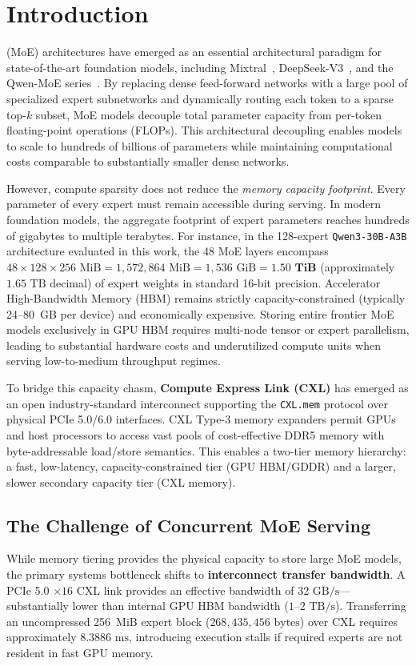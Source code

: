 \documentclass[10pt,journal,compsoc]{IEEEtran}
\begin{document}
\section{Introduction}
 (MoE) architectures have emerged as an essential architectural paradigm for state-of-the-art foundation models, including Mixtral~\cite{jiang2024mixtral}, DeepSeek-V3~\cite{deepseek2024deepseekv3}, and the Qwen-MoE series~\cite{qwen2024qwen25}. By replacing dense feed-forward networks with a large pool of specialized expert subnetworks and dynamically routing each token to a sparse top-$k$ subset, MoE models decouple total parameter capacity from per-token floating-point operations (FLOPs). This architectural decoupling enables models to scale to hundreds of billions of parameters while maintaining computational costs comparable to substantially smaller dense networks.

However, compute sparsity does not reduce the \emph{memory capacity footprint}. Every parameter of every expert must remain accessible during serving. In modern foundation models, the aggregate footprint of expert parameters reaches hundreds of gigabytes to multiple terabytes. For instance, in the 128-expert \texttt{Qwen3-30B-A3B} architecture evaluated in this work, the 48 MoE layers encompass $48 \times 128 \times 256\text{ MiB} = 1,572,864\text{ MiB} = 1,536\text{ GiB} = \mathbf{1.50\text{ TiB}}$ (approximately $1.65\text{ TB}$ decimal) of expert weights in standard 16-bit precision. Accelerator High-Bandwidth Memory (HBM) remains strictly capacity-constrained (typically 24--80~GB per device) and economically expensive. Storing entire frontier MoE models exclusively in GPU HBM requires multi-node tensor or expert parallelism, leading to substantial hardware costs and underutilized compute units when serving low-to-medium throughput regimes.

To bridge this capacity chasm, \textbf{Compute Express Link (CXL)} has emerged as an open industry-standard interconnect supporting the \texttt{CXL.mem} protocol over physical PCIe 5.0/6.0 interfaces. CXL Type-3 memory expanders permit GPUs and host processors to access vast pools of cost-effective DDR5 memory with byte-addressable load/store semantics. This enables a two-tier memory hierarchy: a fast, low-latency, capacity-constrained tier (GPU HBM/GDDR) and a larger, slower secondary capacity tier (CXL memory).

\subsection{The Challenge of Concurrent MoE Serving}
While memory tiering provides the physical capacity to store large MoE models, the primary systems bottleneck shifts to \textbf{interconnect transfer bandwidth}. A PCIe 5.0 $\times 16$ CXL link provides an effective bandwidth of $32\text{ GB/s}$---substantially lower than internal GPU HBM bandwidth ($1\text{--}2\text{ TB/s}$). Transferring an uncompressed 256~MiB expert block ($268,435,456\text{ bytes}$) over CXL requires approximately \textbf{$8.3886\text{ ms}$}, introducing execution stalls if required experts are not resident in fast GPU memory.
\end{document}
